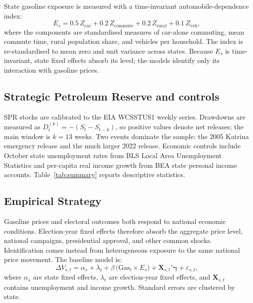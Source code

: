 \documentclass[12pt]{article}
\begin{document}
State gasoline exposure is measured with a time-invariant automobile-dependence index:
\begin{equation}
  E_s = 0.5\,Z_{\mathrm{car}} + 0.2\,Z_{\mathrm{commute}}
      + 0.2\,Z_{\mathrm{rural}} + 0.1\,Z_{\mathrm{veh}},
  \label{eq:exposure}
\end{equation}
where the components are standardised measures of car-alone commuting, mean commute time, rural population share, and vehicles per household. The index is re-standardised to mean zero and unit variance across states. Because $E_s$ is time-invariant, state fixed effects absorb its level; the models identify only its interaction with gasoline prices.

\subsection{Strategic Petroleum Reserve and controls}

SPR stocks are calibrated to the EIA WCSSTUS1 weekly series. Drawdowns are measured as $D_t^{(k)}=-(S_t-S_{t-k})$, so positive values denote net releases; the main window is $k=13$ weeks. Two events dominate the sample: the 2005 Katrina emergency release and the much larger 2022 release. Economic controls include October state unemployment rates from BLS Local Area Unemployment Statistics and per-capita real income growth from BEA state personal income accounts. Table~\ref{tab:summary} reports descriptive statistics.

\subsection{Empirical Strategy}

Gasoline prices and electoral outcomes both respond to national economic conditions. Election-year fixed effects therefore absorb the aggregate price level, national campaigns, presidential approval, and other common shocks. Identification comes instead from heterogeneous exposure to the same national price movement. The baseline model is:
\begin{equation}
  \Delta V_{s,t} = \alpha_s + \lambda_t
  + \beta\,\bigl(\mathrm{Gas}_{t} \times E_s\bigr)
  + \mathbf{X}_{s,t}'\boldsymbol{\gamma}
  + \varepsilon_{s,t},
  \label{eq:main}
\end{equation}
where $\alpha_s$ are state fixed effects, $\lambda_t$ are election-year fixed effects, and $\mathbf{X}_{s,t}$ contains unemployment and income growth. Standard errors are clustered by state.
\end{document}
